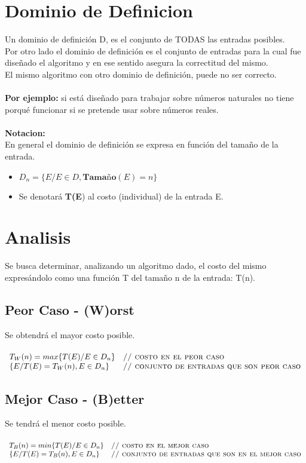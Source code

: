 \documentclass[a4paper,10pt]{article}
\begin{document}
\section{Dominio de Definicion}
Un dominio de definición D, es el conjunto de TODAS las entradas posibles.\\
Por otro lado el dominio de definición es el conjunto de entradas para la cual fue diseñado el
algoritmo y en ese sentido asegura la correctitud del mismo. \\ El mismo algoritmo con otro
dominio de definición, puede no ser correcto. \\\\
\textbf{Por ejemplo:} si está diseñado para trabajar sobre números
naturales no tiene porqué funcionar si se pretende usar sobre números reales. \\\\
\textbf{Notacion:} \\ En general el dominio de definición se expresa en función del tamaño de la entrada.
\begin{itemize}
  \item $D_n = \{ E / E \in D, \textbf{Tamaño}(E) = n \} $
  \item Se denotará \textbf{T(E}) al costo (individual) de la entrada E.
\end{itemize}
\section{Analisis}
Se busca determinar, analizando un algoritmo dado, el costo del mismo expresándolo como una
función T del tamaño n de la entrada: T(n).
\subsection{Peor Caso - (W)orst}
Se obtendrá el mayor costo posible. \\\\
$\begin{array}{ll}
T_W(n) = max\{T(E) / E \in D_n \} & \textsc{// costo en el peor caso} \\
\{E / T(E) = T_W(n), E \in D_n \} & \textsc{// conjunto de entradas que son peor caso}
\end{array}$

\subsection{Mejor Caso - (B)etter}
Se tendrá el menor costo posible. \\\\
$\begin{array}{ll}
T_B(n) = min\{T(E) / E \in D_n \} & \textsc{// costo en el mejor caso} \\
\{E / T(E) = T_B(n), E \in D_n \} & \textsc{// conjunto de entradas que son en el mejor caso}
\end{array}$
\end{document}
